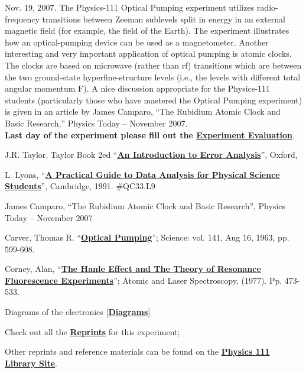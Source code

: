 \documentclass{../lab}
\newcommand{\PhysicsLibrarySite}{http://physics111.lib.berkeley.edu/Physics111/Reprints/OPT/OPT_index.html}
\newcommand{\OPTReprints}{http://physics111.lib.berkeley.edu/Physics111/Reprints/OPT/OPT_index.html}
\newcommand{\ErrorAnalysis}{http://physics111.lib.berkeley.edu/Physics111/Reprints/Data\%20Analysis\%20Book\%20PDF/Introduction_To_Error_Analysis_Taylor_John.pdf}
\newcommand{\DataAnalysis}{http://physics111.lib.berkeley.edu/Physics111/Reprints/Data\%20Analysis\%20Book\%20PDF/Error\%20Analysis\%20Book-Louis\%20Lyons.pdf}
\newcommand{\OpticalPumpingCarver}{http://physics111.lib.berkeley.edu/Physics111/Reprints/OPT/03-Optical_Pumping-Carver.pdf}
\newcommand{\HanleEffect}{http://physics111.lib.berkeley.edu/Physics111/Reprints/OPT/07-Hanle_Effect.pdf}
\newcommand{\Diagrams}{http://physics111.lib.berkeley.edu/Physics111/Reprints/OPT/01-diagrams.pdf}
\begin{document}
Nov. 19, 2007. The Physics-111 Optical Pumping experiment utilizes radio-frequency transitions between Zeeman sublevels split in energy in an external magnetic field (for example, the field of the Earth). The experiment illustrates how an optical-pumping device can be used as a magnetometer. Another interesting and very important application of optical pumping is atomic clocks. The clocks are based on microwave (rather than rf) transitions which are between the two ground-state hyperfine-structure levels (i.e., the levels with different total angular momentum F). A nice discussion appropriate for the Physics-111 students (particularly those who have mastered the Optical Pumping experiment) is given in an article by James Camparo, ``The Rubidium Atomic Clock and Basic Research,'' Physics Today -- November 2007. \\

\noindent\textbf{Last day of the experiment please fill out the \href{\ExperimentEvaluation}{\textbf{Experiment Evaluation}}}.

\begin{thebibliography}{}
\label{references}
J.R. Taylor, Taylor Book 2ed ``\href{\ErrorAnalysis}{\textbf{An Introduction to Error Analysis}}'', Oxford,

L. Lyons, ``\href{\DataAnalysis}{\textbf{A Practical Guide to Data Analysis for Physical Science Students}}'', Cambridge, 1991. \#QC33.L9

James Camparo, ``The Rubidium Atomic Clock and Basic Research'', Physics Today -- November 2007

Carver, Thomas R. ``\href{\OpticalPumpingCarver}{\textbf{Optical Pumping}}''; Science: vol. 141, Aug 16, 1963, pp. 599-608.

Corney, Alan, ``\href{\HanleEffect}{\textbf{The Hanle Effect and The Theory of Resonance Fluorescence Experiments}}''; Atomic and Laser Spectroscopy, (1977). Pp. 473-533.

Diagrams of the electronics [\href{\Diagrams}{\textbf{Diagrams}}]

Check out all the \href{\OPTReprints}{\textbf{Reprints}} for this experiment;
\end{thebibliography}

\vspace{1em}
\noindent Other reprints and reference materials can be found on the \href{\PhysicsLibrarySite}{\textbf{Physics 111 Library Site}}.
\end{document}
